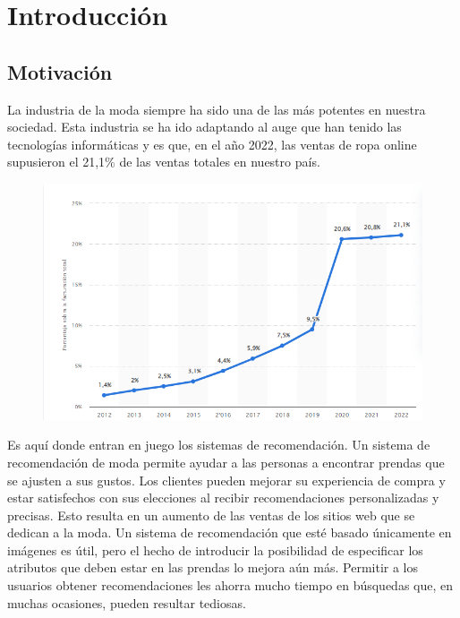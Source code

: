 \documentclass[12pt]{report} %
\begin{document}
\newpage %
\thispagestyle{empty}
\mbox{}


\clearpage
{} %

\chapter{Introducción}

	\section{Motivación}
	La industria de la moda siempre ha sido una de las más potentes en nuestra sociedad.
	Esta industria se ha ido adaptando al auge que han tenido las tecnologías informáticas
	y es que, en el año 2022, las ventas de ropa online supusieron el 21,1\% de las ventas
	totales en nuestro país. 
	\begin{figure}[H]
		{\includegraphics[scale=0.6]{venta-online-moda.png}}
	\end{figure}
	Es aquí donde entran en juego los sistemas de recomendación.
	Un sistema de recomendación de moda permite ayudar a las personas a encontrar prendas
	que se ajusten a sus gustos. 
	Los clientes pueden mejorar su experiencia de compra y estar satisfechos con sus elecciones 
	al recibir recomendaciones personalizadas y precisas. Esto resulta en un aumento
	de las ventas de los sitios web que se dedican a la moda.
	Un sistema de recomendación que esté basado únicamente en imágenes es útil, pero el hecho de
	introducir la posibilidad de especificar los atributos que deben estar en las prendas lo mejora
	aún más. Permitir a los usuarios obtener recomendaciones les ahorra mucho tiempo en búsquedas
	que, en muchas ocasiones, pueden resultar tediosas.
\end{document}
